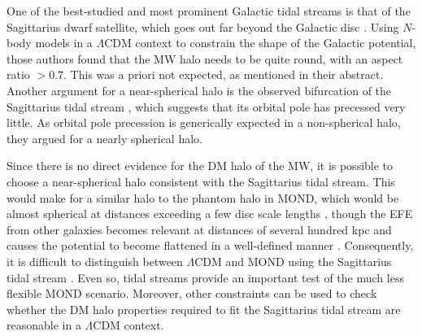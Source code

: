 \documentclass[fleqn,usenatbib,useAMS]{mnras} %
\begin{document}
One of the best-studied and most prominent Galactic tidal streams is that of the Sagittarius dwarf satellite, which goes out far beyond the Galactic disc \citep{Ibata_2001}. Using $N$-body models in a $\Lambda$CDM context to constrain the shape of the Galactic potential, those authors found that the MW halo needs to be quite round, with an aspect ratio $>0.7$. This was a priori not expected, as mentioned in their abstract. Another argument for a near-spherical halo is the observed bifurcation of the Sagittarius tidal stream \citep{Fellhauer_2006}, which suggests that its orbital pole has precessed very little. As orbital pole precession is generically expected in a non-spherical halo, they argued for a nearly spherical halo.

Since there is no direct evidence for the DM halo of the MW, it is possible to choose a near-spherical halo consistent with the Sagittarius tidal stream. This would make for a similar halo to the phantom halo in MOND, which would be almost spherical at distances exceeding a few disc scale lengths \citep{Lughausen_2015}, though the EFE from other galaxies becomes relevant at distances of several hundred kpc and causes the potential to become flattened in a well-defined manner \citep[as discussed in Section~\ref{EFE_theory}; see also][]{Oria_2021}. Consequently, it is difficult to distinguish between $\Lambda$CDM and MOND using the Sagittarius tidal stream \citep{Read_2005}. Even so, tidal streams provide an important test of the much less flexible MOND scenario. Moreover, other constraints can be used to check whether the DM halo properties required to fit the Sagittarius tidal stream are reasonable in a $\Lambda$CDM context.
\end{document}
